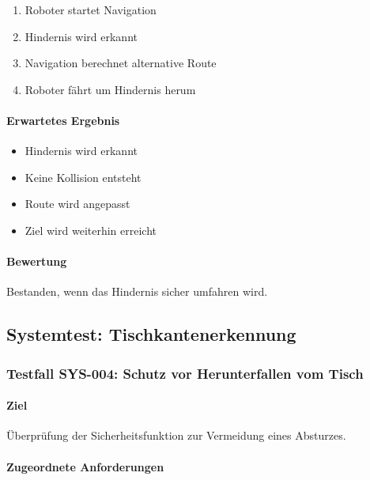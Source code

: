 \begin{enumerate}
\def\labelenumi{\arabic{enumi}.}
\tightlist
\item
  Roboter startet Navigation
\item
  Hindernis wird erkannt
\item
  Navigation berechnet alternative Route
\item
  Roboter fährt um Hindernis herum
\end{enumerate}

\paragraph{Erwartetes Ergebnis}\label{erwartetes-ergebnis-26}

\begin{itemize}
\tightlist
\item
  Hindernis wird erkannt
\item
  Keine Kollision entsteht
\item
  Route wird angepasst
\item
  Ziel wird weiterhin erreicht
\end{itemize}

\paragraph{Bewertung}\label{bewertung-26}

Bestanden, wenn das Hindernis sicher umfahren wird.

\subsection{Systemtest:
Tischkantenerkennung}\label{systemtest-tischkantenerkennung}

\subsubsection{Testfall SYS-004: Schutz vor Herunterfallen vom
Tisch}\label{testfall-sys-004-schutz-vor-herunterfallen-vom-tisch}

\paragraph{Ziel}\label{ziel-27}

Überprüfung der Sicherheitsfunktion zur Vermeidung eines Absturzes.

\paragraph{Zugeordnete
Anforderungen}\label{zugeordnete-anforderungen-27}

